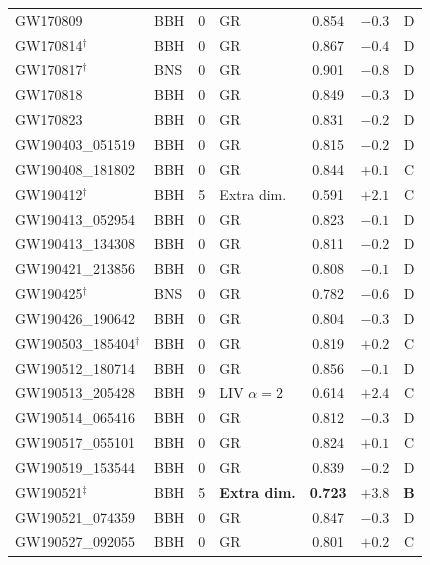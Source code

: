 \documentclass[11pt,a4paper, english]{book}
\theoremstyle{plain}
\theoremstyle{definition}
\numberwithin{equation}{chapter}
\numberwithin{figure}{chapter}
\numberwithin{table}{chapter}
\begin{document}
\begin{landscape}
{\begin{longtable}{@{}p{4.5cm}p{0.9cm}p{1.5cm}p{2.8cm}ccc@{}}
GW170809                   & BBH  & 0  & GR             & 0.854 & $-0.3$ & D \\
GW170814$^\dagger$         & BBH  & 0  & GR             & 0.867 & $-0.4$ & D \\
GW170817$^\dagger$         & BNS  & 0  & GR             & 0.901 & $-0.8$ & D \\
GW170818                   & BBH  & 0  & GR             & 0.849 & $-0.3$ & D \\
GW170823                   & BBH  & 0  & GR             & 0.831 & $-0.2$ & D \\
GW190403\_051519           & BBH  & 0  & GR             & 0.815 & $-0.2$ & D \\
GW190408\_181802           & BBH  & 0  & GR             & 0.844 & $+0.1$ & C \\
GW190412$^\dagger$         & BBH  & 5  & Extra dim.     & 0.591 & $+2.1$ & C \\
GW190413\_052954           & BBH  & 0  & GR             & 0.823 & $-0.1$ & D \\
GW190413\_134308           & BBH  & 0  & GR             & 0.811 & $-0.2$ & D \\
GW190421\_213856           & BBH  & 0  & GR             & 0.808 & $-0.1$ & D \\
GW190425$^\dagger$         & BNS  & 0  & GR             & 0.782 & $-0.6$ & D \\
GW190426\_190642           & BBH  & 0  & GR             & 0.804 & $-0.3$ & D \\
GW190503\_185404$^\dagger$ & BBH  & 0  & GR             & 0.819 & $+0.2$ & C \\
GW190512\_180714           & BBH  & 0  & GR             & 0.856 & $-0.1$ & D \\
GW190513\_205428           & BBH  & 9  & LIV $\alpha{=}2$ & 0.614 & $+2.4$ & C \\
GW190514\_065416           & BBH  & 0  & GR             & 0.812 & $-0.3$ & D \\
GW190517\_055101           & BBH  & 0  & GR             & 0.824 & $+0.1$ & C \\
GW190519\_153544           & BBH  & 0  & GR             & 0.839 & $-0.2$ & D \\
GW190521$^\ddagger$        & BBH  & 5  & \textbf{Extra dim.} & \textbf{0.723} & $\mathbf{+3.8}$ & \textbf{B} \\
GW190521\_074359           & BBH  & 0  & GR             & 0.847 & $-0.3$ & D \\
GW190527\_092055           & BBH  & 0  & GR             & 0.801 & $+0.2$ & C \\

\end{longtable}}
\end{landscape}
\end{document}
